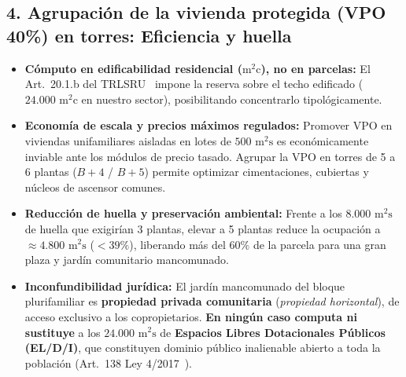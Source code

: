 \documentclass[11pt,a4paper]{article}
\begin{document}
\subsection{4. Agrupación de la vivienda protegida (VPO 40\%) en torres: Eficiencia y huella}
\begin{itemize}
  \item \textbf{Cómputo en edificabilidad residencial ($\text{m}^2\text{c}$), no en parcelas:} El Art.~20.1.b del TRLSRU~\cite{trlsru2015} impone la reserva sobre el techo edificado ($24.000\text{ m}^2\text{c}$ en nuestro sector), posibilitando concentrarlo tipológicamente.
  \item \textbf{Economía de escala y precios máximos regulados:} Promover VPO en viviendas unifamiliares aisladas en lotes de $500\text{ m}^2\text{s}$ es económicamente inviable ante los módulos de precio tasado. Agrupar la VPO en torres de 5 a 6 plantas ($B+4$ / $B+5$) permite optimizar cimentaciones, cubiertas y núcleos de ascensor comunes.
  \item \textbf{Reducción de huella y preservación ambiental:} Frente a los $8.000\text{ m}^2\text{s}$ de huella que exigirían 3 plantas, elevar a 5 plantas reduce la ocupación a $\approx 4.800\text{ m}^2\text{s}$ ($< 39\%$), liberando más del $60\%$ de la parcela para una gran plaza y jardín comunitario mancomunado.
  \item \textbf{Inconfundibilidad jurídica:} El jardín mancomunado del bloque plurifamiliar es \textbf{propiedad privada comunitaria} (\textit{propiedad horizontal}), de acceso exclusivo a los copropietarios. \textbf{En ningún caso computa ni sustituye} a los $24.000\text{ m}^2\text{s}$ de \textbf{Espacios Libres Dotacionales Públicos (EL/D/I)}, que constituyen dominio público inalienable abierto a toda la población (Art.~138 Ley 4/2017~\cite{ley4_2017_canarias}).
\end{itemize}

\newpage


\end{document}
